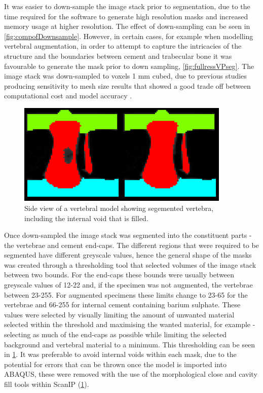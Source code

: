 It was easier to down-sample the image stack prior to segmentation, due to the
time required for the software to generate high resolution masks and increased
memory usage at higher resolution. The effect of down-sampling can be seen in
\cref{fig:compofDownsample}. However, in certain cases, for example when
modelling vertebral augmentation, in order to attempt to capture the
intricacies of the structure and the boundaries between cement and trabecular
bone it was favourable to generate the mask prior to down sampling,
\cref{fig:fullressVPseg}. The image stack was down-sampled to voxels 1 mm
cubed, due to previous studies producing sensitivity to mesh size results that
showed a good trade off between computational cost and model accuracy
\cite{Jones2007}.



\begin{figure}[ht!]
\centering
  \includegraphics[width=4in]{images/fillTheVoid.png}
  \caption{Side view of a vertebral model showing segemented vertebra, including the internal void that is filled.}
\label{fig:fillTheVoid}
\end{figure}


Once down-sampled the image stack was segmented into the constituent parts -
the vertebrae and cement end-caps. The different regions that were required to
be segmented have different greyscale values, hence the general shape of the
masks was created through a thresholding tool that selected volumes of the
image stack between two bounds. For the end-caps these bounds were usually
between greyscale values of 12-22 and, if the specimen was not augmented, the
vertebrae between 23-255. For augmented specimens these limits change to 23-65
for the vertebrae and 66-255 for internal cement containing barium sulphate.
These values were selected by visually limiting the amount of unwanted material
selected within the threshold and maximising the wanted material, for example -
selecting as much of the end-caps as possible while limiting the selected
background and vertebral material to a minimum. This thresholding can be seen
in \cref{fig:fillTheVoid}.  It was preferable to avoid internal voids within
each mask, due to the potential for errors that can be thrown once the model is
imported into ABAQUS, these were removed with the use of the morphological
close and cavity fill tools within ScanIP (\cref{fig:fillTheVoid}).





